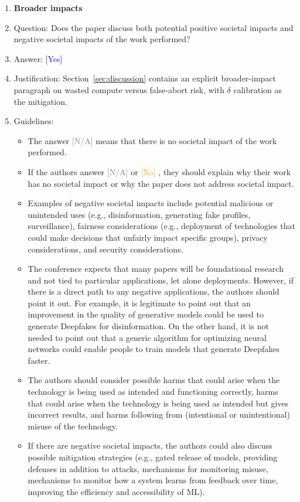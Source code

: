 \documentclass{article}
\providecommand{\answerYes}[1][]{\textcolor{blue}{[Yes] #1}}
\providecommand{\answerNo}[1][]{\textcolor{orange}{[No] #1}}
\providecommand{\answerNA}[1][]{\textcolor{gray}{[N/A] #1}}
\begin{document}
\begin{enumerate}
\item {\bf Broader impacts}
    \item[] Question: Does the paper discuss both potential positive societal impacts and negative societal impacts of the work performed?
    \item[] Answer: \answerYes{}
    \item[] Justification: Section~\ref{sec:discussion} contains an explicit broader-impact paragraph on wasted compute versus false-abort risk, with $\delta$ calibration as the mitigation.
    \item[] Guidelines:
    \begin{itemize}
        \item The answer \answerNA{} means that there is no societal impact of the work performed.
        \item If the authors answer \answerNA{} or \answerNo, they should explain why their work has no societal impact or why the paper does not address societal impact.
        \item Examples of negative societal impacts include potential malicious or unintended uses (e.g., disinformation, generating fake profiles, surveillance), fairness considerations (e.g., deployment of technologies that could make decisions that unfairly impact specific groups), privacy considerations, and security considerations.
        \item The conference expects that many papers will be foundational research and not tied to particular applications, let alone deployments. However, if there is a direct path to any negative applications, the authors should point it out. For example, it is legitimate to point out that an improvement in the quality of generative models could be used to generate Deepfakes for disinformation. On the other hand, it is not needed to point out that a generic algorithm for optimizing neural networks could enable people to train models that generate Deepfakes faster.
        \item The authors should consider possible harms that could arise when the technology is being used as intended and functioning correctly, harms that could arise when the technology is being used as intended but gives incorrect results, and harms following from (intentional or unintentional) misuse of the technology.
        \item If there are negative societal impacts, the authors could also discuss possible mitigation strategies (e.g., gated release of models, providing defenses in addition to attacks, mechanisms for monitoring misuse, mechanisms to monitor how a system learns from feedback over time, improving the efficiency and accessibility of ML).
    \end{itemize}


\end{enumerate}
\end{document}
